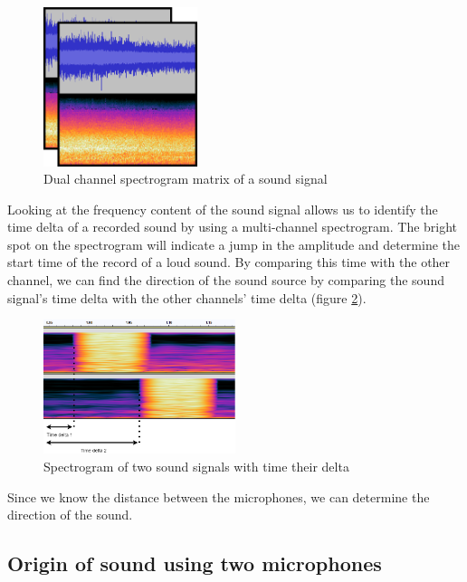 \begin{figure}[H]
    \centering
    \includegraphics[width=0.4\textwidth]{../Images/2-channel-spectrogram-example.png}
    \caption{Dual channel spectrogram matrix of a sound signal}
    \label{fig:2_channel_spectrogram_example}
\end{figure}

Looking at the frequency content of the sound signal allows us to identify the time delta of a recorded sound by using a multi-channel spectrogram. The bright spot on the spectrogram will indicate a jump in the amplitude and determine the start time of the record of a loud sound. By comparing this time with the other channel, we can find the direction of the sound source by comparing the sound signal's time delta with the other channels' time delta (figure \ref*{fig:spectrogram_offset}).

\begin{figure}[H]
    \centering
    \includegraphics[width=0.5\textwidth]{../Images/time_delta.png}
    \caption{Spectrogram of two sound signals with time their delta}
    \label{fig:spectrogram_offset}
\end{figure}

Since we know the distance between the microphones, we can determine the direction of the sound.

\subsection{Origin of sound using two microphones}

